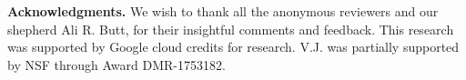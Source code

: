 

\noindent \textbf{Acknowledgments.} We wish to thank all the anonymous reviewers and our shepherd Ali R. Butt, for  their insightful comments and feedback.
This research was supported by Google cloud credits for research. 
V.J. was partially supported by NSF through Award DMR-1753182.




